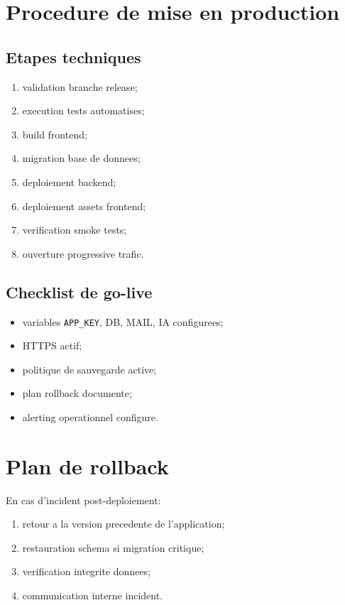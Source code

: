 \documentclass[12pt,a4paper,oneside]{report}
\begin{document}
\section{Procedure de mise en production}
\subsection{Etapes techniques}
\begin{enumerate}[leftmargin=1.2cm]
  \item validation branche release;
  \item execution tests automatises;
  \item build frontend;
  \item migration base de donnees;
  \item deploiement backend;
  \item deploiement assets frontend;
  \item verification smoke tests;
  \item ouverture progressive trafic.
\end{enumerate}

\subsection{Checklist de go-live}
\begin{itemize}[leftmargin=1.2cm]
  \item variables \texttt{APP\_KEY}, DB, MAIL, IA configurees;
  \item HTTPS actif;
  \item politique de sauvegarde active;
  \item plan rollback documente;
  \item alerting operationnel configure.
\end{itemize}

\section{Plan de rollback}
En cas d'incident post-deploiement:
\begin{enumerate}[leftmargin=1.2cm]
  \item retour a la version precedente de l'application;
  \item restauration schema si migration critique;
  \item verification integrite donnees;
  \item communication interne incident.
\end{enumerate}
\end{document}
